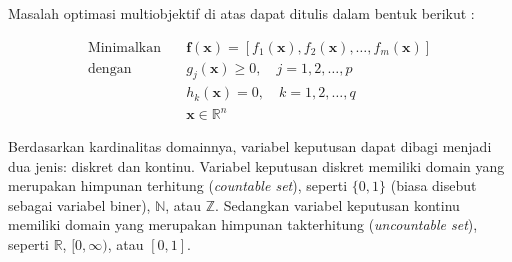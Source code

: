 Masalah optimasi multiobjektif di atas dapat ditulis dalam bentuk berikut :

\begin{align}
\text{Minimalkan} \quad & \mathbf{f}(\mathbf{x}) = [f_1(\mathbf{x}),f_2(\mathbf{x}),\dots,f_m(\mathbf{x})] \\
\text{dengan} \quad & g_j(\mathbf{x}) \geq 0, \quad j = 1, 2, \dots, p \\
						   & h_k(\mathbf{x}) = 0, \quad k = 1, 2, \dots, q \\
						   & \mathbf{x} \in \mathbb{R}^n
\end{align}  

Berdasarkan kardinalitas domainnya, variabel keputusan dapat dibagi menjadi dua jenis: diskret dan kontinu. Variabel keputusan diskret memiliki domain yang merupakan himpunan terhitung (\textit{countable set}), seperti $\{0,1\}$ (biasa disebut sebagai variabel biner), $\mathbb{N}$, atau $\mathbb{Z}$. Sedangkan variabel keputusan kontinu memiliki domain yang merupakan himpunan takterhitung (\textit{uncountable set}), seperti $\mathbb{R}$, $[0,\infty)$, atau $[0,1]$.
